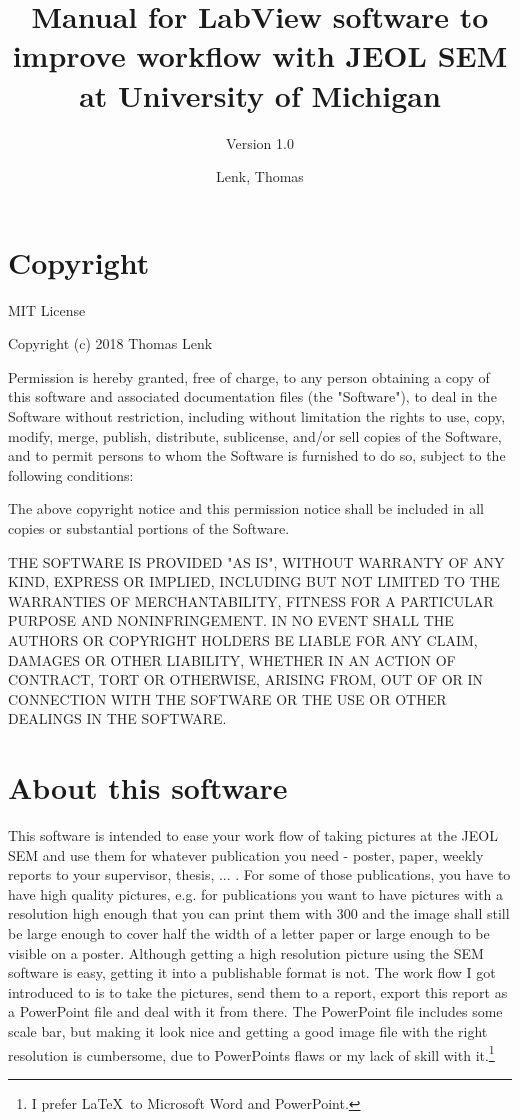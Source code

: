 \documentclass[english]{scrartcl}
\title{Manual for LabView software to improve workflow with JEOL SEM at University of Michigan}
\subtitle{Version 1.0}
\author{Lenk, Thomas}
\begin{document}
\maketitle
\section{Copyright}
MIT License

Copyright (c) 2018 Thomas Lenk

Permission is hereby granted, free of charge, to any person obtaining a copy of this software and associated documentation files (the "Software"), to deal in the Software without restriction, including without limitation the rights to use, copy, modify, merge, publish, distribute, sublicense, and/or sell copies of the Software, and to permit persons to whom the Software is furnished to do so, subject to the following conditions:

The above copyright notice and this permission notice shall be included in all copies or substantial portions of the Software.

THE SOFTWARE IS PROVIDED "AS IS", WITHOUT WARRANTY OF ANY KIND, EXPRESS OR IMPLIED, INCLUDING BUT NOT LIMITED TO THE WARRANTIES OF MERCHANTABILITY, FITNESS FOR A PARTICULAR PURPOSE AND NONINFRINGEMENT. IN NO EVENT SHALL THE AUTHORS OR COPYRIGHT HOLDERS BE LIABLE FOR ANY CLAIM, DAMAGES OR OTHER LIABILITY, WHETHER IN AN ACTION OF CONTRACT, TORT OR OTHERWISE, ARISING FROM, OUT OF OR IN CONNECTION WITH THE SOFTWARE OR THE USE OR OTHER DEALINGS IN THE SOFTWARE.
\section{About this software}
This software is intended to ease your work flow of taking pictures at the JEOL SEM and use them for whatever publication you need - poster, paper, weekly reports to your supervisor, thesis, ... .
For some of those publications, you have to have high quality pictures, e.g. for publications you want to have pictures with a resolution high enough that you can print them with \SI{300}{\dpi} and the image shall still be large enough to cover half the width of a letter paper or large enough to be visible on a poster. Although getting a high resolution picture using the SEM software is easy, getting it into a publishable format is not. The work flow I got introduced to is to take the pictures, send them to a report, export this report as a PowerPoint file and deal with it from there. The PowerPoint file includes some scale bar, but making it look nice and getting a good image file with the right resolution is cumbersome, due to PowerPoints flaws or my lack of skill with it.\footnote{I prefer \LaTeX\ to Microsoft Word and PowerPoint.}
\end{document}
